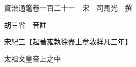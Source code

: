 










 


 
 


 

  
  
  
  
  





  
  
  
  
  
 
  

  

  
  
  



  

 
 

  
   




  

  
  


  　　資治通鑑卷一百二十一　宋　司馬光　撰

　　胡三省　音註

　　宋紀三【起著雍執徐盡上章敦牂凡三年】

　　太祖文皇帝上之中

